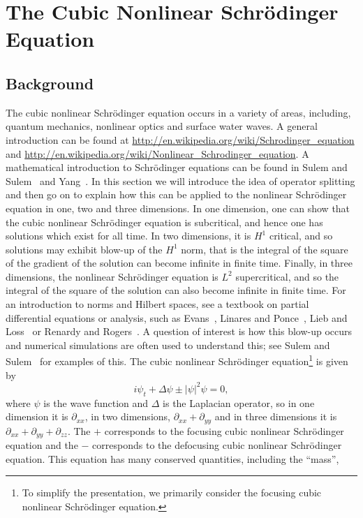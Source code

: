 \chapter{The Cubic Nonlinear Schr\"{o}dinger Equation}

\section{Background}

The cubic nonlinear Schr\"{o}dinger equation occurs in a variety of areas, including, quantum mechanics, nonlinear optics and surface water waves. A general introduction can be found at \url{http://en.wikipedia.org/wiki/Schrodinger_equation} and \url{http://en.wikipedia.org/wiki/Nonlinear_Schrodinger_equation}. A mathematical introduction to Schr\"{o}dinger equations can be found in Sulem and Sulem~\cite{SulSul99} and Yang~\cite{Yan10}. In this section we will introduce the idea of operator splitting and then go on to explain how this can be applied to the nonlinear Schr\"{o}dinger equation in one, two and three dimensions. In one dimension, one can show that the cubic nonlinear Schr\"{o}dinger equation is subcritical, and hence one has solutions which exist for all time. In two dimensions, it is $H^1$ critical, and so solutions may exhibit blow-up of the $H^1$ norm, that is the integral of the square of the gradient of the solution can become infinite in finite time.  Finally, in three dimensions, the nonlinear Schr\"{o}dinger equation is $L^2$ supercritical, and so the integral of the square of the solution can also become infinite in finite time. For an introduction to norms and Hilbert spaces, see a textbook on partial differential equations or analysis, such as Evans~\cite{Eva10}, Linares and Ponce~\cite{LinPon09}, Lieb and Loss~\cite{LieLos03} or Renardy and Rogers~\cite{RenRog04}. A question of interest is how this blow-up occurs and numerical simulations are often used to understand this; see Sulem and Sulem~\cite{SulSul99} for examples of this. The cubic nonlinear Schr\"{o}dinger equation\footnote{To simplify the presentation, we primarily consider the focusing cubic nonlinear Schr\"{o}dinger equation.} is given by
\begin{equation}
i\psi_t + \Delta \psi \pm\lvert \psi \rvert^2\psi =0,
\end{equation}
where $\psi$ is the wave function and $\Delta$ is the Laplacian operator, so in one dimension it is $\partial_{xx}$, in two dimensions, $\partial_{xx}+\partial_{yy}$ and in three dimensions it is $\partial_{xx}+\partial_{yy}+\partial_{zz}$. The $+$ corresponds to the focusing cubic nonlinear Schr\"{o}dinger equation and the $-$ corresponds to the defocusing cubic nonlinear Schr\"{o}dinger equation. This equation has many conserved quantities, including the ``mass'',
